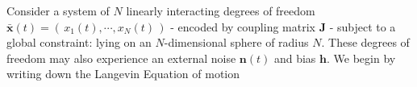 Consider a system of $N$ linearly interacting degrees of freedom  $\mathbf{\bar x}(t) = \left(\,x_1(t),\cdots, x_N(t)\,\right)$ - encoded by coupling matrix $\mathbf{J}$ - subject to a global constraint: lying on an $N$-dimensional sphere of radius $N$. These degrees of freedom may also experience an external noise $\mathbf{n}(t)$ and bias $\mathbf{h}$. We begin by writing down the Langevin Equation of motion